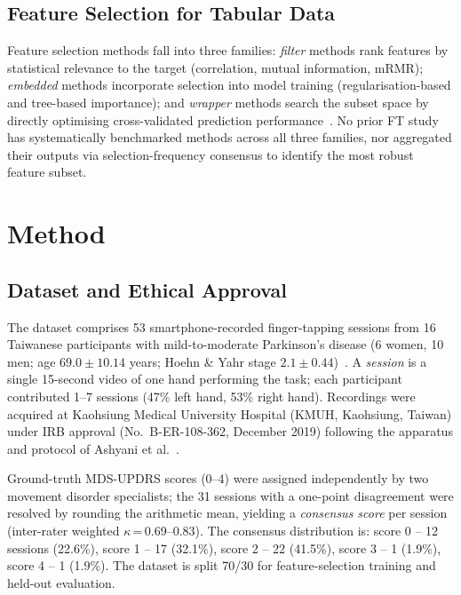 \documentclass[conference]{IEEEtran}
\begin{document}
\subsection{Feature Selection for Tabular Data}
Feature selection methods fall into three families: \emph{filter} methods rank features
by statistical relevance to the target (correlation, mutual information, mRMR);
\emph{embedded} methods incorporate selection into model training (regularisation-based
and tree-based importance); and \emph{wrapper} methods search the subset space by
directly optimising cross-validated prediction performance~\cite{tibshirani1996}.
No prior FT study has systematically benchmarked methods across all three families,
nor aggregated their outputs via selection-frequency consensus to identify the most
robust feature subset.

\section{Method}

\subsection{Dataset and Ethical Approval}

The dataset comprises 53 smartphone-recorded finger-tapping sessions from
16 Taiwanese participants with mild-to-moderate Parkinson's disease (6 women, 10 men;
age $69.0 \pm 10.14$ years; Hoehn \& Yahr stage $2.1 \pm 0.44$)~\cite{goetz2004movement}.
A \emph{session} is a single 15-second video of one hand performing the task; each
participant contributed 1--7 sessions (47\% left hand, 53\% right hand).
Recordings were acquired at Kaohsiung Medical University Hospital (KMUH, Kaohsiung,
Taiwan) under IRB approval (No.~B-ER-108-362, December 2019) following the apparatus
and protocol of Ashyani et al.~\cite{ashyani2022digitization}.

Ground-truth MDS-UPDRS scores (0--4) were assigned independently by two movement
disorder specialists; the 31 sessions with a one-point disagreement were resolved by
rounding the arithmetic mean, yielding a \emph{consensus score} per session
(inter-rater weighted $\kappa$\,=\,0.69--0.83).
The consensus distribution is: score 0 -- 12 sessions (22.6\%), score 1 -- 17 (32.1\%),
score 2 -- 22 (41.5\%), score 3 -- 1 (1.9\%), score 4 -- 1 (1.9\%).
The dataset is split 70/30 for feature-selection training and held-out evaluation.
\end{document}
